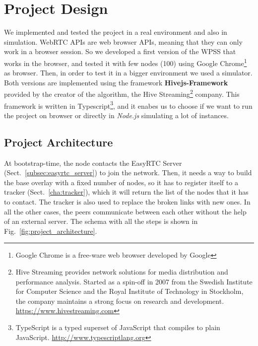 \chapter{Project Design}
\label{cha:design}
We implemented and tested the project in a real environment and also in simulation. WebRTC APIs are web browser APIs, meaning that they can only work in a browser session. So we developed a first version of the WPSS that works in the browser, and tested it with few nodes (100) using Google Chrome\footnote{Google Chrome is a free-ware web browser developed by Google} as browser. Then, in order to test it in a bigger environment we used a simulator. Both versions are implemented using the framework \textbf{Hivejs-Framework} provided by the creator of the algorithm, the Hive Streaming\footnote{Hive Streaming provides network solutions for media distribution and performance analysis. Started as a spin-off in 2007 from the Swedish Institute for Computer Science and the Royal Institute of Technology in Stockholm, the company maintains a strong focus on research and development. \url{https://www.hivestreaming.com}} company. This framework is written in Typescript\footnote{TypeScript is a typed superset of JavaScript that compiles to plain JavaScript. \url{http://www.typescriptlang.org}}, and it enabes us to choose if we want to run the project on browser or directly in \textit{Node.js} simulating a lot of instances. 


\section{Project Architecture}
\label{sec:arch}
At bootstrap-time, the node contacts the EasyRTC Server (Sect.~\ref{subsec:easyrtc_server}) to join the network. Then, it needs a way to build the base overlay with a fixed number of nodes, so it has to register itself to a tracker (Sect.~\ref{cha:tracker}), which it will return the list of the nodes that it has to contact. The tracker is also used to replace the broken links with new ones. In all the other cases, the peers communicate between each other without the help of an external server. The schema with all the steps is shown in Fig.~\ref{fig:project_architecture}.

